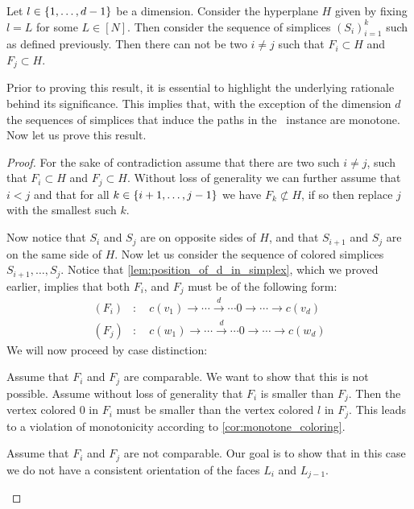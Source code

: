\begin{proposition}
    Let $l \in \left\{1, \dots, d-1\right\}$ be a dimension. Consider the hyperplane $H$ given by fixing $l = L$ for some $L \in [N]$. Then consider the sequence of simplices $\left(S_i\right)_{i=1}^{k}$ such as defined previously. Then there can not be two $i \neq j$ such that $F_i \subset H$ and $F_j \subset H$.
\end{proposition}
Prior to proving this result, it is essential to highlight the underlying rationale behind its significance. This implies that, with the exception of the dimension $d$ the sequences of simplices that induce the paths in the \EndOfLine\ instance are monotone. Now let us prove this result.
\begin{proof}
    For the sake of contradiction assume that there are two such $i \neq j$, such that $F_i \subset H$ and $F_j \subset H$. Without loss of generality we can further assume that $i < j$ and that for all $k \in \left\{i+1, \dots, j-1\right\}$ we have $F_k \not\subset H$, if so then replace $j$ with the smallest such $k$.\par
    Now notice that $S_i$ and $S_{j}$ are on opposite sides of $H$, and that $S_{i+1}$ and $S_{j}$ are on the same side of $H$. Now let us consider the sequence of colored simplices $S_{i+1}, \dots, S_j$. Notice that \cref{lem:position_of_d_in_simplex}, which we proved earlier, implies that both $F_i$, and $F_j$ must be of the following form:
    \begin{align*}
        (F_i) & : \quad c(v_1) \xrightarrow{}  \cdots \xrightarrow{d} \cdots  0 \xrightarrow{} \cdots \xrightarrow{} c(v_d) \\
        (F_j) & : \quad c(w_1) \xrightarrow{}  \cdots \xrightarrow{d} \cdots  0 \xrightarrow{} \cdots \xrightarrow{} c(w_d)
    \end{align*}
    We will now proceed by case distinction:
    \begin{case}{1}
        Assume that $F_i$ and $F_j$ are comparable. We want to show that this is not possible. Assume without loss of generality that $F_i$ is smaller than $F_j$. Then the vertex colored $0$ in $F_i$ must be smaller than the vertex colored $l$ in $F_j$. This leads to a violation of monotonicity according to \cref{cor:monotone_coloring}.
    \end{case}
    \begin{case}{2}
        Assume that $F_i$ and $F_j$ are not comparable. Our goal is to show that in this case we do not have a consistent orientation of the faces $L_i$ and $L_{j-1}$.
    \end{case}
\end{proof}
